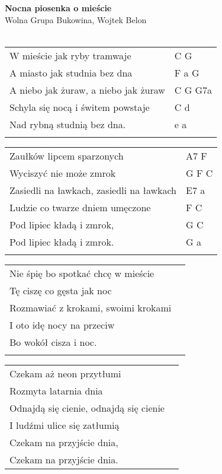 \documentclass[a5paper]{article}
\begin{document}


\noindent
\noindent
\fontsize{12pt}{15pt}\selectfont
\textbf{Nocna piosenka o mieście} \\
\fontsize{8pt}{10pt}\selectfont
Wolna Grupa Bukowina, Wojtek Belon \\ \\
\fontsize{10pt}{12pt}\selectfont

\noindent
\begin{tabular}{@{}p{7.00cm}p{3cm}@{}}
W mieście jak ryby tramwaje & C G \\
A miasto jak studnia bez dna & F a G \\
A niebo jak żuraw, a niebo jak żuraw & C G G7a \\
Schyla się nocą i świtem powstaje & C d \\
Nad rybną studnią bez dna. & e a \\ \\
\end{tabular}

\noindent
\begin{tabular}{@{}p{8.00cm}p{3cm}@{}}
	Zaułków lipcem sparzonych & A7 F \\
	Wyciszyć nie może zmrok	& G F C	\\
	Zasiedli na ławkach, zasiedli na ławkach & E7 a \\
	Ludzie co twarze dniem umęczone	& F C \\
	Pod lipiec kładą i zmrok, & G C \\
	Pod lipiec kładą i zmrok. & G a \\ \\
\end{tabular}

\noindent
\begin{tabular}{@{}p{8.00cm}p{3cm}@{}}
	Nie śpię bo spotkać chcę w mieście & \\
	Tę ciszę co gęsta jak noc & \\
	Rozmawiać z krokami, swoimi krokami & \\
	I oto idę nocy na przeciw & \\
	Bo wokół cisza i noc. & \\ \\
\end{tabular}

\noindent
\begin{tabular}{@{}p{8.00cm}p{3cm}@{}}
	Czekam aż neon przytłumi & \\
	Rozmyta latarnia dnia & \\
	Odnajdą się cienie, odnajdą się cienie & \\
	I ludźmi ulice się zatłumią	& \\
	Czekam na przyjście dnia, & \\
	Czekam na przyjście dnia. &
\end{tabular}
\end{document}

